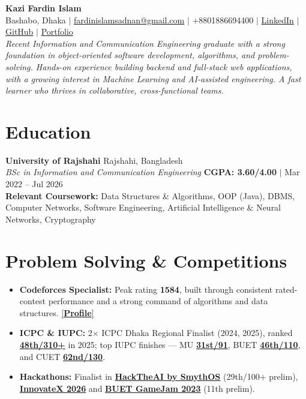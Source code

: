 \documentclass[letterpaper,10pt]{article}
\begin{document}
\noindent
{\fontsize{19.5pt}{22pt}\selectfont \textbf{Kazi Fardin Islam}}\\[3pt]
{\fontsize{10.3pt}{11.9pt}\selectfont
Bashabo, Dhaka $|$
\href{mailto:fardinislamsadnan@gmail.com}{fardinislamsadnan@gmail.com} $|$
+8801886694400 $|$
\href{https://www.linkedin.com/in/fardin-islam-sadnan-162ba6248/}{LinkedIn} $|$
\href{https://github.com/NightmareXIX}{GitHub} $|$
\href{https://fardinislamsadnan.vercel.app/}{Portfolio}
}\\[4pt]
{\fontsize{9.9pt}{12pt}\selectfont\itshape
Recent Information and Communication Engineering graduate with a strong foundation in object-oriented software development,
algorithms, and problem-solving. Hands-on experience building backend and full-stack web applications, with a growing interest
in Machine Learning and AI-assisted engineering. A fast learner who thrives in collaborative, cross-functional teams.
}

\section*{Education}
\textbf{University of Rajshahi} \hfill Rajshahi, Bangladesh \\
\textit{BSc in Information and Communication Engineering} \hfill \textbf{CGPA: 3.60/4.00} $|$ Mar 2022 -- Jul 2026 \\
\textbf{Relevant Coursework:} Data Structures \& Algorithms, OOP (Java), DBMS, Computer Networks, Software Engineering, Artificial Intelligence \& Neural Networks, Cryptography

\section*{Problem Solving \& Competitions}
\begin{itemize}
    \item \textbf{Codeforces Specialist:} Peak rating \textbf{1584}, built through consistent rated-contest performance and a strong command of algorithms and data structures. \href{https://codeforces.com/profile/Sednone}{[\textbf{Profile}]}
    \item \textbf{ICPC \& IUPC:} 2$\times$ ICPC Dhaka Regional Finalist (2024, 2025), ranked \href{https://icpc.global/regionals/finder/Dhaka-2026/standings}{\textbf{48th/310+}} in 2025; top IUPC finishes --- MU \href{https://toph.co/c/inter-university-mu-cse-fest-2025/standings}{\textbf{31st/91}}, BUET \href{https://toph.co/c/inter-university-buet-cse-fest-2026/standings}{\textbf{46th/110}}, and CUET \href{https://toph.co/c/cuet-iupc-2025/standings}{\textbf{62nd/130}}.
    \item \textbf{Hackathons:} Finalist in \href{https://www.linkedin.com/posts/fardin-islam-sadnan-162ba6248_hacktheai-ai-hackathon-activity-7374463307413454848-IZqg}{\textbf{HackTheAI by SmythOS}} (29th/100+ prelim), \href{https://www.linkedin.com/posts/fardin-islam-sadnan-162ba6248_innovatex2025-hackathon-activity-7326538422200795136-dVeL}{\textbf{InnovateX 2026}} and \href{https://itch.io/jam/buet-cse-fest-2023-game-jam/results}{\textbf{BUET GameJam 2023}} (11th prelim).
\end{itemize}
\end{document}
